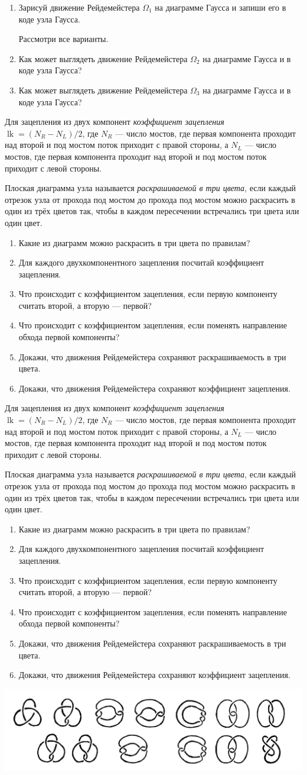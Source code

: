 \documentclass[12pt]{article}
\DeclareMathOperator{\lk}{lk}
\theoremstyle{definition}
\begin{document}
{\begin{enumerate}
    
    \item Зарисуй движение Рейдемейстера $\Omega_1$ на диаграмме Гаусса и 
    запиши его в коде узла Гаусса. 

    Рассмотри все варианты.
    \item Как может выглядеть движение Рейдемейстера $\Omega_2$ на диаграмме Гаусса и 
    в коде узла Гаусса? 
    \item Как может выглядеть движение Рейдемейстера $\Omega_3$ на диаграмме Гаусса и 
    в коде узла Гаусса?
  \end{enumerate}
}

\newpage
\dayfour
\vfill
\dayfour
\newpage



\newcommand{\daysix}{
Для зацепления из двух компонент \textit{коэффициент зацепления} $\lk = (N_R - N_L) /2$, где $N_R$ — число мостов, 
где первая компонента проходит над второй и под мостом поток приходит с правой стороны, 
а $N_L$ — число мостов, где первая компонента проходит над второй и под мостом поток приходит с левой стороны.

Плоская диаграмма узла называется \textit{раскрашиваемой в три цвета}, если каждый отрезок узла от прохода под мостом до прохода под мостом 
можно раскрасить в один из трёх цветов так, чтобы в каждом пересечении встречались три цвета или один цвет.

\begin{enumerate}
  \item Какие из диаграмм можно раскрасить в три цвета по правилам?
  \item Для каждого двухкомпонентного зацепления посчитай коэффициент зацепления.
  \item Что происходит с коэффициентом зацепления, если первую компоненту считать второй, а вторую — первой?
  \item Что происходит с коэффициентом зацепления, если поменять направление обхода первой компоненты?
  \item Докажи, что движения Рейдемейстера сохраняют раскрашиваемость в три цвета.
  \item Докажи, что движения Рейдемейстера сохраняют коэффициент зацепления.
\end{enumerate}

}

\newpage
\daysix
\vfill
\daysix
\newpage

\includegraphics[scale=0.7]{pictures/two-lines.png}
\end{document}
